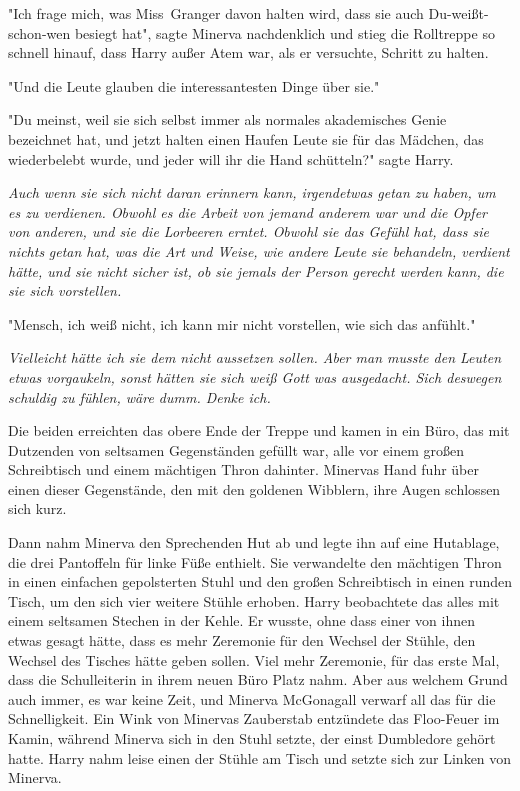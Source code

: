 {"Ich frage mich, was Miss~Granger davon halten wird, dass sie auch Du-weißt-schon-wen besiegt hat", sagte Minerva nachdenklich und stieg die Rolltreppe so schnell hinauf, dass Harry außer Atem war, als er versuchte, Schritt zu halten.

"Und die Leute glauben die interessantesten Dinge über sie."

"Du meinst, weil sie sich selbst immer als normales akademisches Genie bezeichnet hat, und jetzt halten einen Haufen Leute sie für das Mädchen, das wiederbelebt wurde, und jeder will ihr die Hand schütteln?" sagte Harry.

\emph{Auch wenn sie sich nicht daran erinnern kann, irgendetwas getan zu haben, um es zu verdienen. Obwohl es die Arbeit von jemand anderem war und die Opfer von anderen, und sie die Lorbeeren erntet. Obwohl sie das Gefühl hat, dass sie nichts} \emph{getan hat, was die Art und Weise, wie andere Leute sie behandeln, verdient hätte, und sie nicht sicher ist, ob sie jemals der Person gerecht werden kann, die sie sich vorstellen.}

"Mensch, ich weiß nicht, ich kann mir nicht vorstellen, wie sich das anfühlt."

\emph{Vielleicht hätte ich sie dem nicht aussetzen sollen. Aber man musste den Leuten etwas vorgaukeln, sonst hätten sie sich weiß Gott was ausgedacht. Sich deswegen schuldig zu fühlen, wäre dumm. Denke ich.}

Die beiden erreichten das obere Ende der Treppe und kamen in ein Büro, das mit Dutzenden von seltsamen Gegenständen gefüllt war, alle vor einem großen Schreibtisch und einem mächtigen Thron dahinter. Minervas Hand fuhr über einen dieser Gegenstände, den mit den goldenen Wibblern, ihre Augen schlossen sich kurz.

Dann nahm Minerva den Sprechenden Hut ab und legte ihn auf eine Hutablage, die drei Pantoffeln für linke Füße enthielt. Sie verwandelte den mächtigen Thron in einen einfachen gepolsterten Stuhl und den großen Schreibtisch in einen runden Tisch, um den sich vier weitere Stühle erhoben. Harry beobachtete das alles mit einem seltsamen Stechen in der Kehle. Er wusste, ohne dass einer von ihnen etwas gesagt hätte, dass es mehr Zeremonie für den Wechsel der Stühle, den Wechsel des Tisches hätte geben sollen. Viel mehr Zeremonie, für das erste Mal, dass die Schulleiterin in ihrem neuen Büro Platz nahm. Aber aus welchem Grund auch immer, es war keine Zeit, und Minerva McGonagall verwarf all das für die Schnelligkeit. Ein Wink von Minervas Zauberstab entzündete das Floo-Feuer im Kamin, während Minerva sich in den Stuhl setzte, der einst Dumbledore gehört hatte. Harry nahm leise einen der Stühle am Tisch und setzte sich zur Linken von Minerva.

}
